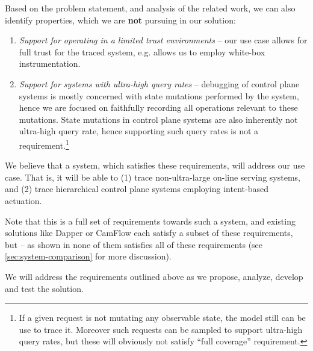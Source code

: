 Based on the problem statement, and analysis of the related work, we can also identify properties, which we are \textbf{not} pursuing in our solution:
%
\begin{enumerate}
    \item \textit{Support for operating in a limited trust environments} -- our use case allows for full trust for the traced system, e.g. allows us to employ white-box instrumentation.
    \item \textit{Support for systems with ultra-high query rates} -- debugging of control plane systems is mostly concerned with state mutations performed by the system, hence we are focused on faithfully recording all operations relevant to these mutations. State mutations in control plane systems are also inherently not ultra-high query rate, hence supporting such query rates is not a requirement.\footnote{If a given request is not mutating any observable state, the model still can be use to trace it. Moreover such requests can be sampled to support ultra-high query rates, but these will obviously not satisfy ``full coverage'' requirement.}
\end{enumerate}

We believe that a system, which satisfies these requirements, will address our use case. That is, it will be able to (1) trace non-ultra-large on-line serving systems, and (2) trace hierarchical control plane systems employing intent-based actuation.

Note that this is a full set of requirements towards such a system, and existing solutions like Dapper or CamFlow each satisfy a subset of these requirements, but -- as shown in  none of them satisfies all of these requirements (see \cref{sec:system-comparison} for more discussion).

We will address the requirements outlined above as we propose, analyze, develop and test the solution.


\begin{comment}
ZOSTAWIAM NA WSZELKI WYPADEK, PEWNIE UZYJE ELEMENTOW W ROZNYCH MIEJSCACH.

\begin{itemize}
	\item Correctness if protocol is followed [\textit{correctness}]
	\item Suitable for use in existing systems via engineering-in instrumentation without a need for a full rewrite \textit{instrumentation}]
    \item Support for eventually consistent view of incoming data to deal with inevitable faults in distributed systems (e.g. ability to incrementally refine data in global data model) [\textit{eventual-consistency}]
\end{itemize} 
\end{comment}
